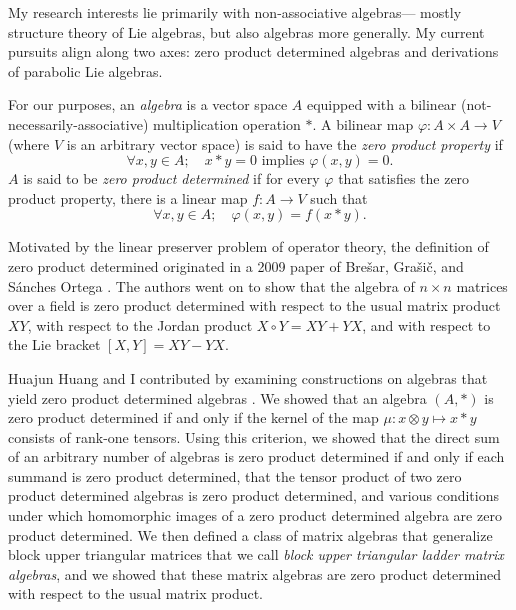 \documentclass[11pt]{article}
\begin{document}

\makeletterhead

\maketitle

\vfill

My research interests lie primarily with non-associative algebras---%
mostly structure theory of Lie algebras, but also algebras more
generally. My current pursuits align along two axes: zero product
determined algebras and derivations of parabolic Lie algebras.


For our purposes, an \emph{algebra} is a vector space $A$ equipped with
a bilinear (not-necessarily-associative) multiplication operation
$\ast$.
A bilinear map $\varphi : A \times A \to V$
(where $V$ is an arbitrary vector space)
is said to have the \emph{zero product property} if
\[
  \forall x, y \in A;\quad
  x \ast y = 0 \text{ implies } \varphi(x,y) = 0
  \text{.}
\]
$A$ is said to be \emph{zero product determined} if for every $\varphi$
that satisfies the zero product property, there is a linear map
$f : A \to V$ such that
\[
  \forall x, y \in A;\quad
  \varphi(x,y) = f(x \ast y)
  \text{.}
\]

Motivated by the linear preserver problem of operator theory, the
definition of zero product determined originated in a 2009 paper of
Bre\v{s}ar, Gra\v{s}i\v{c}, and S\'{a}nches Ortega
\cite{brevsar2009zero}. The authors went on to show that the algebra of
$n \times n$ matrices over a field is zero product determined with
respect to the usual matrix product $XY$, with respect to the Jordan
product $X \circ Y = XY + YX$, and with respect to the Lie bracket
$[X,Y] = XY - YX$.

Huajun Huang and I contributed by examining constructions on algebras
that yield zero product determined algebras
\cite{article:brice2015zero}. We showed that an algebra $(A, \ast)$ is
zero product determined if and only if the kernel of the map $\mu : x
\otimes y \mapsto x \ast y$ consists of rank-one tensors. Using this
criterion, we showed that the direct sum of an arbitrary number of
algebras is zero product determined if and only if each summand is zero
product determined, that the tensor product of two zero product
determined algebras is zero product determined, and various conditions
under which homomorphic images of a zero product determined algebra are
zero product determined. We then defined a class of matrix algebras that
generalize block upper triangular matrices that we call \emph{block
upper triangular ladder matrix algebras}, and we showed that these
matrix algebras are zero product determined with respect to the usual
matrix product.
\end{document}
